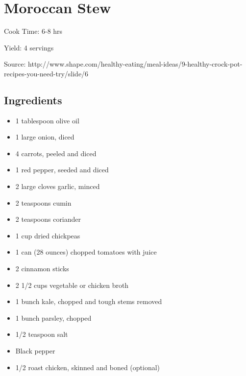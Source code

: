 \section{Moroccan Stew}

\begin{center}
Cook Time: 6-8 hrs

\noindent Yield: 4 servings

\vspace{1em}

Source: http://www.shape.com/healthy-eating/meal-ideas/9-healthy-crock-pot-recipes-you-need-try/slide/6
\end{center}

\subsection{Ingredients}
\begin{multicols}{2}
\begin{itemize}
    \item 1 tablespoon olive oil
    \item 1 large onion, diced
    \item 4 carrots, peeled and diced
    \item 1 red pepper, seeded and diced
    \item 2 large cloves garlic, minced
    \item 2 teaspoons cumin
    \item 2 teaspoons coriander
    \item 1 cup dried chickpeas
    \item 1 can (28 ounces) chopped tomatoes with juice
    \item 2 cinnamon sticks
    \item 2 1/2 cups vegetable or chicken broth
    \item 1 bunch kale, chopped and tough stems removed
    \item 1 bunch parsley, chopped
    \item 1/2 teaspoon salt
    \item Black pepper
    \item 1/2 roast chicken, skinned and boned (optional)
\end{itemize}
\end{multicols}

